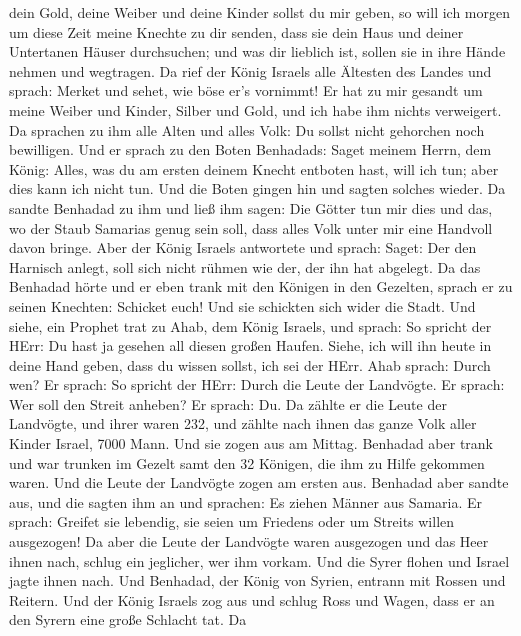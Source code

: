 dein Gold, deine Weiber und deine Kinder sollst du mir geben,
 so will ich morgen um diese Zeit meine Knechte zu dir
senden, dass sie dein Haus und deiner Untertanen Häuser durchsuchen; und
was dir lieblich ist, sollen sie in ihre Hände nehmen und wegtragen.
 Da rief der König Israels alle Ältesten des Landes und
sprach: Merket und sehet, wie böse er's vornimmt! Er hat zu mir gesandt
um meine Weiber und Kinder, Silber und Gold, und ich habe ihm nichts
verweigert.  Da sprachen zu ihm alle Alten und alles Volk:
Du sollst nicht gehorchen noch bewilligen.  Und er sprach zu
den Boten Benhadads: Saget meinem Herrn, dem König: Alles, was du am
ersten deinem Knecht entboten hast, will ich tun; aber dies kann ich
nicht tun. Und die Boten gingen hin und sagten solches wieder.
 Da sandte Benhadad zu ihm und ließ ihm sagen: Die Götter
tun mir dies und das, wo der Staub Samarias genug sein soll, dass alles
Volk unter mir eine Handvoll davon bringe.  Aber der König
Israels antwortete und sprach: Saget: Der den Harnisch anlegt, soll sich
nicht rühmen wie der, der ihn hat abgelegt.  Da das
Benhadad hörte und er eben trank mit den Königen in den Gezelten, sprach
er zu seinen Knechten: Schicket euch! Und sie schickten sich wider die
Stadt.  Und siehe, ein Prophet trat zu Ahab, dem König
Israels, und sprach: So spricht der HErr: Du hast ja gesehen all diesen
großen Haufen. Siehe, ich will ihn heute in deine Hand geben, dass du
wissen sollst, ich sei der HErr.  Ahab sprach: Durch wen?
Er sprach: So spricht der HErr: Durch die Leute der Landvögte. Er
sprach: Wer soll den Streit anheben? Er sprach: Du.  Da
zählte er die Leute der Landvögte, und ihrer waren 232, und zählte nach
ihnen das ganze Volk aller Kinder Israel, 7000 Mann.  Und
sie zogen aus am Mittag. Benhadad aber trank und war trunken im Gezelt
samt den 32 Königen, die ihm zu Hilfe gekommen waren.  Und
die Leute der Landvögte zogen am ersten aus. Benhadad aber sandte aus,
und die sagten ihm an und sprachen: Es ziehen Männer aus Samaria.
 Er sprach: Greifet sie lebendig, sie seien um Friedens
oder um Streits willen ausgezogen!  Da aber die Leute der
Landvögte waren ausgezogen und das Heer ihnen nach,  schlug
ein jeglicher, wer ihm vorkam. Und die Syrer flohen und Israel jagte
ihnen nach. Und Benhadad, der König von Syrien, entrann mit Rossen und
Reitern.  Und der König Israels zog aus und schlug Ross und
Wagen, dass er an den Syrern eine große Schlacht tat.  Da
